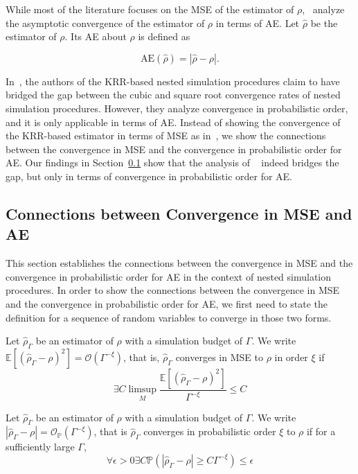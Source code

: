 While most of the literature focuses on the MSE of the estimator of $\rho$,~\cite{wang2022smooth} analyze the asymptotic convergence of the estimator of $\rho$ in terms of AE.
Let $\hat{\rho}$ be the estimator of $\rho$. Its AE about $\rho$ is defined as

$$
\mbox{AE}\left(\hat{\rho}\right) = \left| \hat{\rho} - \rho \right|.
$$

In~\cite{wang2022smooth}, the authors of the KRR-based nested simulation procedures claim to have bridged the gap between the cubic and square root convergence rates of nested simulation procedures. However, they analyze convergence in probabilistic order, and it is only applicable in terms of AE. 
Instead of showing the convergence of the KRR-based estimator in terms of MSE as in~\cite{gordy2010nested}, we show the connections between the convergence in MSE and the convergence in probabilistic order for AE.
Our findings in Section~\ref{sec1:connection-mse-absolute-error} show that the analysis of ~\cite{wang2022smooth} indeed bridges the gap, but only in terms of convergence in probabilistic order for AE.

\subsection{Connections between Convergence in MSE and AE} \label{sec1:connection-mse-absolute-error}

This section establishes the connections between the convergence in MSE and the convergence in probabilistic order for AE in the context of nested simulation procedures.
In order to show the connections between the convergence in MSE and the convergence in probabilistic order for AE, we first need to state the definition for a sequence of random variables to converge in those two forms.

\begin{definition}
    Let $\hat{\rho}_{\Gamma}$ be an estimator of $\rho$ with a simulation budget of $\Gamma$. 
    We write $\mathbb{E} \left[ \left(\hat{\rho}_{\Gamma} - \rho\right)^2 \right] = \mathcal{O} \left( \Gamma^{-\xi} \right)$, that is, $\hat{\rho}_{\Gamma}$ converges in MSE to $\rho$ in order $\xi$ if 
    $$
        \exists C \limsup_{M} \frac{\mathbb{E} \left[\left(\hat{\rho}_{\Gamma} - \rho\right)^2 \right]}{\Gamma^{-\xi}} \leq C
    $$
\end{definition}

\begin{definition}
    Let $\hat{\rho}_{\Gamma}$ be an estimator of $\rho$ with a simulation budget of $\Gamma$. 
    We write $|\hat{\rho}_{\Gamma} - \rho| = \mathcal{O}_{\mathbb{P}}(\Gamma^{-\xi})$, that is $\hat{\rho}_{\Gamma}$ converges in probabilistic order $\xi$ to $\rho$ if for a sufficiently large $\Gamma$,
    $$
        \forall \epsilon > 0 \exists C \mathbb{P} \left( \left| \hat{\rho}_{\Gamma} - \rho \right| \geq C \Gamma^{-\xi} \right) \leq \epsilon 
    $$
\end{definition}

